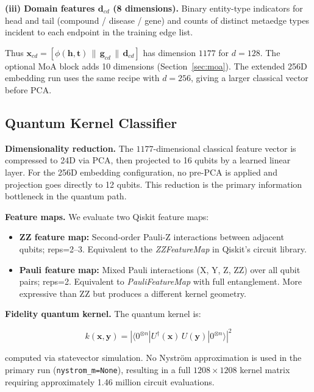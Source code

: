 \documentclass[twocolumn,10pt]{article}
\begin{document}
\textbf{(iii) Domain features $\mathbf{d}_{cd}$ (8 dimensions).} Binary entity-type indicators for head and tail (compound / disease / gene) and counts of distinct metaedge types incident to each endpoint in the training edge list.

Thus $\mathbf{x}_{cd} = [\phi(\mathbf{h},\mathbf{t})\,\|\,\mathbf{g}_{cd}\,\|\,\mathbf{d}_{cd}]$ has dimension $1177$ for $d{=}128$. The optional MoA block adds 10 dimensions (Section~\ref{sec:moa}). The extended 256D embedding run uses the same recipe with $d{=}256$, giving a larger classical vector before PCA.

\subsection{Quantum Kernel Classifier}

\textbf{Dimensionality reduction.} The $1177$-dimensional classical feature vector is compressed to 24D via PCA, then projected to 16 qubits by a learned linear layer. For the 256D embedding configuration, no pre-PCA is applied and projection goes directly to 12 qubits. This reduction is the primary information bottleneck in the quantum path.

\textbf{Feature maps.} We evaluate two Qiskit \cite{qiskit2023} feature maps:
\begin{itemize}[leftmargin=*]
\item \textbf{ZZ feature map:} Second-order Pauli-Z interactions between adjacent qubits; reps=2--3. Equivalent to the \textit{ZZFeatureMap} in Qiskit's circuit library.
\item \textbf{Pauli feature map:} Mixed Pauli interactions (X, Y, Z, ZZ) over all qubit pairs; reps=2. Equivalent to \textit{PauliFeatureMap} with full entanglement. More expressive than ZZ but produces a different kernel geometry.
\end{itemize}

\textbf{Fidelity quantum kernel.} The quantum kernel is:

\begin{equation}
k(\mathbf{x}, \mathbf{y}) = \left|\langle 0^{\otimes n} | U^\dagger(\mathbf{x})\, U(\mathbf{y}) | 0^{\otimes n} \rangle\right|^2
\end{equation}

computed via statevector simulation. No Nystr\"{o}m approximation is used in the primary run (\texttt{nystrom\_m=None}), resulting in a full $1208 \times 1208$ kernel matrix requiring approximately 1.46 million circuit evaluations.
\end{document}
